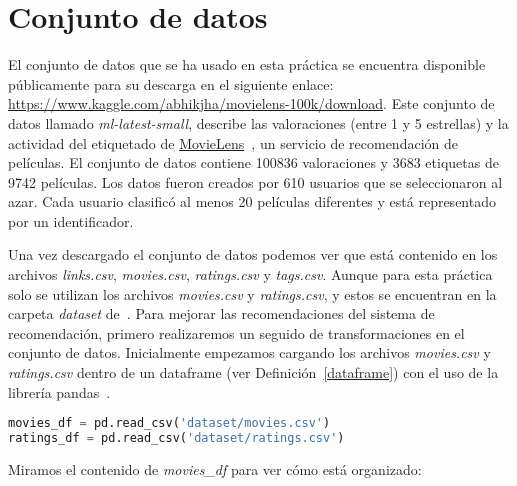 \documentclass{uimppracticas}
\begin{document}
\section{Conjunto de datos}\label{conjunto_datos}

El conjunto de datos que se ha usado en esta práctica se encuentra disponible públicamente para su descarga en el siguiente enlace: \url{https://www.kaggle.com/abhikjha/movielens-100k/download}. Este conjunto de datos llamado \textit{ml-latest-small}, describe las valoraciones (entre 1 y 5 estrellas) y la actividad del etiquetado de \href{http://movielens.org}{MovieLens}~\cite{MovieLens}, un servicio de recomendación de películas. El conjunto de datos contiene 100836 valoraciones y 3683 etiquetas de 9742 películas. Los datos fueron creados por 610 usuarios que se seleccionaron al azar. Cada usuario clasificó al menos 20 películas diferentes y está representado por un identificador.

Una vez descargado el conjunto de datos podemos ver que está contenido en los archivos \textit{links.csv}, \textit{movies.csv}, \textit{ratings.csv} y \textit{tags.csv}. Aunque para esta práctica solo se utilizan los archivos \textit{movies.csv} y \textit{ratings.csv}, y estos se encuentran en la carpeta \textit{dataset} de~\cite{GitHubRepo}. Para mejorar las recomendaciones del sistema de recomendación, primero realizaremos un seguido de transformaciones en el conjunto de datos. Inicialmente empezamos cargando los archivos \textit{movies.csv} y \textit{ratings.csv} dentro de un dataframe (ver Definición~\ref{dataframe}) con el uso de la librería pandas~\cite{pandas}.

\begin{lstlisting}[language=python, basicstyle=\small]
movies_df = pd.read_csv('dataset/movies.csv')
ratings_df = pd.read_csv('dataset/ratings.csv')
\end{lstlisting}

Miramos el contenido de \textit{movies\_df} para ver cómo está organizado:
\end{document}
